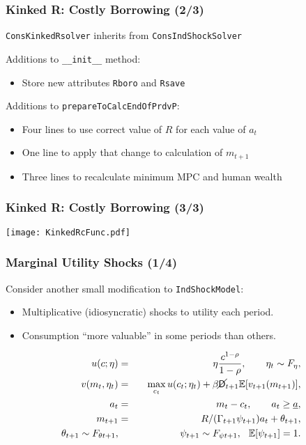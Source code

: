 \documentclass[public]{beamer}\beamerdefaultoverlayspecification{<+->}
\begin{document}
\begin{frame}
  \frametitle{Kinked R: Costly Borrowing (2/3)}
  \texttt{ConsKinkedRsolver} inherits from \texttt{ConsIndShockSolver}

  \begin{block}{Additions to \texttt{\_\_init\_\_} method:}
    \begin{itemize}
    \item Store new attributes \texttt{Rboro} and \texttt{Rsave}
    \end{itemize}
  \end{block}
  \begin{block}{Additions to \texttt{prepareToCalcEndOfPrdvP}:}
    \begin{itemize}
    \item Four lines to use correct value of $R$ for each value of $a_t$

    \item One line to apply that change to calculation of $m_{t+1}$

    \item Three lines to recalculate minimum MPC and human wealth
    \end{itemize}
  \end{block}
\end{frame}


\begin{frame}
  \frametitle{Kinked R: Costly Borrowing (3/3)}
  \begin{center}
    \texttt{[image: KinkedRcFunc.pdf]}
  \end{center}
\end{frame}


\begin{frame}
  \frametitle{Marginal Utility Shocks (1/4)}
  Consider another small modification to \texttt{IndShockModel}:
  \begin{itemize}
  \item Multiplicative (idiosyncratic) shocks to utility each period.

  \item Consumption ``more valuable'' in some periods than others.
  \end{itemize}
  \begin{eqnarray*}
    u(c;\eta) &=& \eta \frac{c^{1-\rho}}{1-\rho}, \qquad \eta_t \sim F_{\eta}, \\
    v(m_t,\eta_t) &=& \max_{c_t} u(c_t;\eta_t) + \beta \cancel{\mathsf{D}}_{t+1} \mathbb{E} [v_{t+1}(m_{t+1}) ], \\
    a_t &=& m_t - c_t, \qquad a_t \geq \underline{a}, \\
    m_{t+1} &=& R/(\Gamma_{t+1} \psi_{t+1}) a_t + \theta_{t+1}, \\
    \theta_{t+1} \sim F_{\theta t+1}, &\qquad& \psi_{t+1} \sim F_{\psi t+1}, \hspace{0.25cm} \mathbb{E}[\psi_{t+1}] = 1.
  \end{eqnarray*}
\end{frame}
\end{document}
